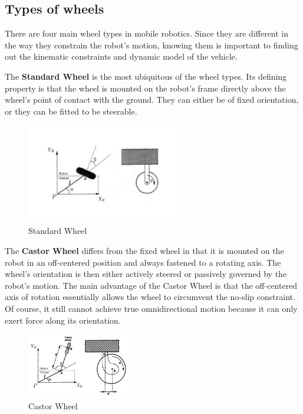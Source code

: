 \documentclass[twoside]{article}
\begin{document}
\subsection*{Types of wheels}

There are four main wheel types in mobile robotics. Since they are different in the way they constrain the robot's motion, knowing them is important to finding out the kinematic constraints and dynamic model of the vehicle.

The \textbf{Standard Wheel} is the most ubiquitous of the wheel types. Its defining property is that the wheel is mounted on the robot's frame directly above the wheel's point of contact with the ground. They can either be of fixed orientation, or they can be fitted to be steerable\cite{sns}.

\begin{figure}[H]
\centering
\includegraphics[width=0.6\textwidth]{Standard_Wheel}
\caption{Standard Wheel}
\end{figure}


The \textbf{Castor Wheel} differs from the fixed wheel in that it is mounted on the robot in an off-centered position and always fastened to a rotating axis. The wheel's orientation is then either actively steered or passively governed by the robot's motion. The main advantage of the Castor Wheel is that the off-centered axis of rotation essentially allows the wheel to circumvent the no-slip constraint. Of course, it still cannot achieve true omnidirectional motion because it can only exert force along its orientation\cite{sns}.

\begin{figure}[h]
\centering
\includegraphics[width=0.4\textwidth]{cast}
\caption{Castor Wheel}
\end{figure}
\end{document}
